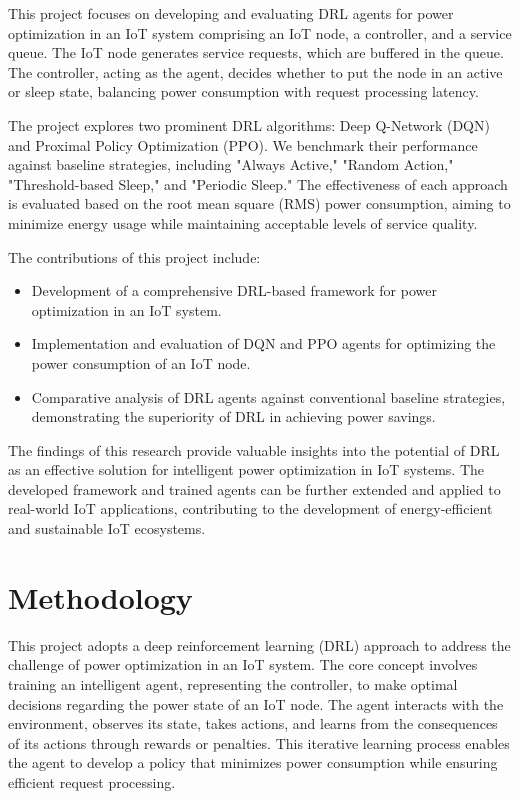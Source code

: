 \documentclass[11pt,a4paper]{article}
\begin{document}
This project focuses on developing and evaluating DRL agents for power optimization in an IoT system comprising an IoT node, a controller, and a service queue. The IoT node generates service requests, which are buffered in the queue. The controller, acting as the agent, decides whether to put the node in an active or sleep state, balancing power consumption with request processing latency.

The project explores two prominent DRL algorithms: Deep Q-Network (DQN) and Proximal Policy Optimization (PPO). We benchmark their performance against baseline strategies, including "Always Active," "Random Action," "Threshold-based Sleep," and "Periodic Sleep." The effectiveness of each approach is evaluated based on the root mean square (RMS) power consumption, aiming to minimize energy usage while maintaining acceptable levels of service quality.

The contributions of this project include:
\begin{itemize}
    \item Development of a comprehensive DRL-based framework for power optimization in an IoT system.
    \item Implementation and evaluation of DQN and PPO agents for optimizing the power consumption of an IoT node.
    \item Comparative analysis of DRL agents against conventional baseline strategies, demonstrating the superiority of DRL in achieving power savings.
\end{itemize}

The findings of this research provide valuable insights into the potential of DRL as an effective solution for intelligent power optimization in IoT systems. The developed framework and trained agents can be further extended and applied to real-world IoT applications, contributing to the development of energy-efficient and sustainable IoT ecosystems.

\section{Methodology}
This project adopts a deep reinforcement learning (DRL) approach to address the challenge of power optimization in an IoT system. The core concept involves training an intelligent agent, representing the controller, to make optimal decisions regarding the power state of an IoT node. The agent interacts with the environment, observes its state, takes actions, and learns from the consequences of its actions through rewards or penalties. This iterative learning process enables the agent to develop a policy that minimizes power consumption while ensuring efficient request processing.
\end{document}
